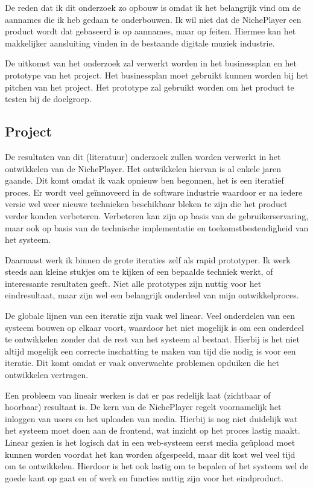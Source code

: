 De reden dat ik dit onderzoek zo opbouw is omdat ik het belangrijk vind om de aannames die ik heb gedaan te onderbouwen. Ik wil niet dat de NichePlayer een product wordt dat gebaseerd is op aannames, maar op feiten. Hiermee kan het makkelijker aansluiting vinden in de bestaande digitale muziek industrie.


De uitkomst van het onderzoek zal verwerkt worden in het businessplan en het prototype van het project. Het businessplan moet gebruikt kunnen worden bij het pitchen van het project. Het prototype zal gebruikt worden om het product te testen bij de doelgroep.

\subsection{Project}
De resultaten van dit (literatuur) onderzoek zullen worden verwerkt in het ontwikkelen van de NichePlayer. Het ontwikkelen hiervan is al enkele jaren gaande. Dit komt omdat ik vaak opnieuw ben begonnen, het is een iteratief proces. Er wordt veel geïnnoveerd in de software industrie waardoor er na iedere versie wel weer nieuwe technieken beschikbaar bleken te zijn die het product verder konden verbeteren. Verbeteren kan zijn op basis van de gebruikerservaring, maar ook op basis van de technische implementatie en toekomstbestendigheid van het systeem.

Daarnaast werk ik binnen de grote iteraties zelf als rapid prototyper. Ik werk steeds aan kleine stukjes om te kijken of een bepaalde techniek werkt, of interessante resultaten geeft. Niet alle prototypes zijn nuttig voor het eindresultaat, maar zijn wel een belangrijk onderdeel van mijn ontwikkelproces.

De globale lijnen van een iteratie zijn vaak wel linear. Veel onderdelen van een systeem bouwen op elkaar voort, waardoor het niet mogelijk is om een onderdeel te ontwikkelen zonder dat de rest van het systeem al bestaat. Hierbij is het niet altijd mogelijk een correcte inschatting te maken van tijd die nodig is voor een iteratie. Dit komt omdat er vaak onverwachte problemen opduiken die het ontwikkelen vertragen.

Een probleem van lineair werken is dat er pas redelijk laat (zichtbaar of hoorbaar) resultaat is. De kern van de NichePlayer regelt voornamelijk het inloggen van users en het uploaden van media. Hierbij is nog niet duidelijk wat het systeem moet doen aan de frontend, wat inzicht op het proces lastig maakt. Linear gezien is het logisch dat in een web-systeem eerst media geüpload moet kunnen worden voordat het kan worden afgespeeld, maar dit kost wel veel tijd om te ontwikkelen. Hierdoor is het ook lastig om te bepalen of het systeem wel de goede kant op gaat en of werk en functies nuttig zijn voor het eindproduct.

